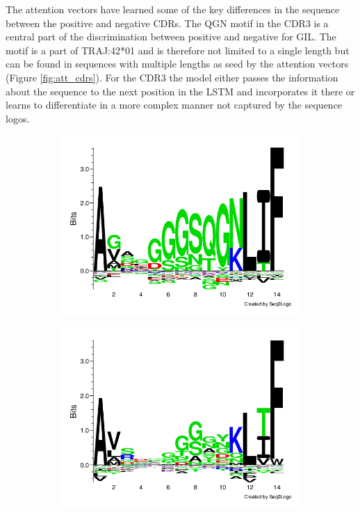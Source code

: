 The attention vectors have learned some of the key differences in the sequence between the positive and negative CDRs. The QGN motif in the CDR3{\textalpha} is a central part of the discrimination between positive and negative for GIL. The motif is a part of TRAJ:42*01 and is therefore not limited to a single length but can be found in sequences with multiple lengths as seed by the attention vectors (Figure \ref{fig:att_cdrs}). For the CDR3{\textbeta} the model either passes the information about the sequence to the next position in the LSTM and incorporates it there or learns to differentiate in a more complex manner not captured by the sequence logos.

\begin{figure}[H]
\centering
\begin{subfigure}[b]{0.45\textwidth}
   \includegraphics[width=\textwidth]{figures/seq2logo_cd3a_pos.png}
   \caption{}
   \label{fig:logo_cdr3apos} 
\end{subfigure}
\begin{subfigure}[b]{0.45\textwidth}
   \includegraphics[width=\textwidth]{figures/seq2logo_cd3a_neg.png}

\end{subfigure}
\end{figure}
